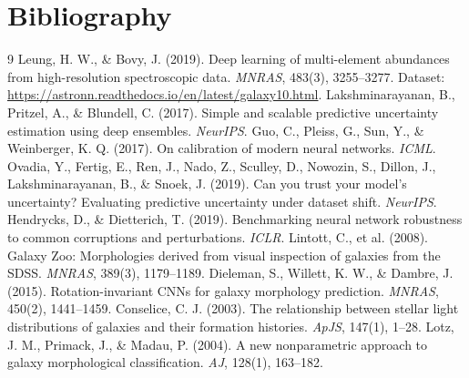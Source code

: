 \documentclass[10pt,a4paper]{article}
\begin{document}
\section*{Bibliography}
\footnotesize
\begin{thebibliography}{9}
 Leung, H. W., \& Bovy, J. (2019). Deep learning of multi-element abundances from high-resolution spectroscopic data. \textit{MNRAS}, 483(3), 3255--3277. Dataset: \url{https://astronn.readthedocs.io/en/latest/galaxy10.html}.
 Lakshminarayanan, B., Pritzel, A., \& Blundell, C. (2017). Simple and scalable predictive uncertainty estimation using deep ensembles. \textit{NeurIPS}.
 Guo, C., Pleiss, G., Sun, Y., \& Weinberger, K. Q. (2017). On calibration of modern neural networks. \textit{ICML}.
 Ovadia, Y., Fertig, E., Ren, J., Nado, Z., Sculley, D., Nowozin, S., Dillon, J., Lakshminarayanan, B., \& Snoek, J. (2019). Can you trust your model's uncertainty? Evaluating predictive uncertainty under dataset shift. \textit{NeurIPS}.
 Hendrycks, D., \& Dietterich, T. (2019). Benchmarking neural network robustness to common corruptions and perturbations. \textit{ICLR}.
 Lintott, C., et al. (2008). Galaxy Zoo: Morphologies derived from visual inspection of galaxies from the SDSS. \textit{MNRAS}, 389(3), 1179--1189.
 Dieleman, S., Willett, K. W., \& Dambre, J. (2015). Rotation-invariant CNNs for galaxy morphology prediction. \textit{MNRAS}, 450(2), 1441--1459.
 Conselice, C. J. (2003). The relationship between stellar light distributions of galaxies and their formation histories. \textit{ApJS}, 147(1), 1--28.
 Lotz, J. M., Primack, J., \& Madau, P. (2004). A new nonparametric approach to galaxy morphological classification. \textit{AJ}, 128(1), 163--182.
\end{thebibliography}
\end{document}
